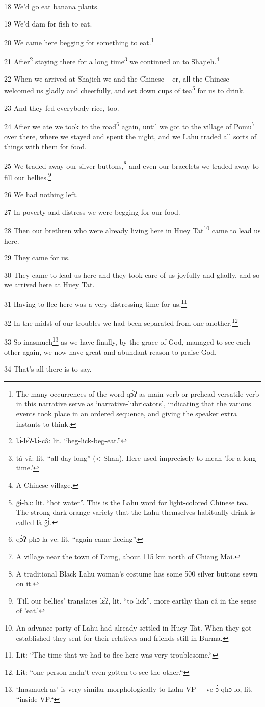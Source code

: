 18 We'd go eat banana plants.

19 We'd dam for fish to eat.

20 We came here begging for something to eat.\footnote{The many occurrences of the word qɔ̀ʔ as main verb or prehead versatile verb in this narrative serve as `narrative-lubricators', indicating that the various events took place in an ordered sequence, and giving the speaker extra instants to think.}

21 After\footnote{lɔ̀-lɛ̀ʔ-lɔ̀-câ: lit. ``beg-lick-beg-eat.''} staying there for a long time\footnote{tâ-vâ: lit. ``all day long'' (< Shan). Here used imprecisely to mean 'for a long time.'} we continued on to Shajieh.\footnote{A Chinese village.}

22 When we arrived at Shajieh we and the Chinese -- er, all the Chinese welcomed
us gladly and cheerfully, and set down cups of tea\footnote{g̈ɨ̀-hɔ: lit. ``hot water''. This is the Lahu word for light-colored Chinese tea. The strong dark-orange variety that the Lahu themselves habitually drink is called là-g̈ɨ̀.} for us to drink.

23 And they fed everybody rice, too.

24 After we ate we took to the road\footnote{qɔ̀ʔ phɔ la ve: lit. ``again came fleeing''.} again, until we got to the village of Pomu\footnote{A village near the town of Farng, about 115 km north of Chiang Mai.}
over there, where we stayed and spent the night, and we Lahu traded all sorts of
things with them for food.

25 We traded away our silver buttons,\footnote{A traditional Black Lahu woman's costume has some 500 silver buttons sewn on it.} and even our bracelets we traded away
to fill our bellies.\footnote{'Fill our bellies' translates lɛ̀ʔ, lit. ``to lick'', more earthy than câ in the sense of 'eat.'}

26 We had nothing left.

27 In poverty and distress we were begging for our food.

28 Then our brethren who were already living here in Huey Tat\footnote{An advance party of Lahu had already settled in Huey Tat. When they got established they sent for their relatives and friends still in Burma.} came to lead
us here.

29 They came for us.

30 They came to lead us here and they took care of us joyfully and gladly, and
so we arrived here at Huey Tat.

31 Having to flee here was a very distressing time for us.\footnote{Lit: ``The time that we had to flee here was very troublesome.``}

32 In the midst of our troubles we had been separated from one another.\footnote{Lit: ``one person hadn't even gotten to see the other.``}

33 So inasmuch\footnote{`Inasmuch as' is very similar morphologically to Lahu VP + ve ɔ̀-qhɔ lo, lit. ``inside VP.``} as we have finally, by the grace of God, managed to see each
other again, we now have great and abundant reason to praise God.

34 That's all there is to say.


